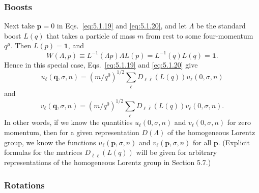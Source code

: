 \subsubsection*{Boosts}

Next take $\mathbf{p}=0$ in Eqs.~\eqref{eq:5.1.19} and \eqref{eq:5.1.20}, and let $\Lambda$
be the standard boost $L(q)$ that takes a particle of mass $m$ from rest to
some four-momentum $q^\mu$. Then $L(p)=\mathbf{1}$, and
\[
  W(\Lambda,p)\equiv L^{-1}(\Lambda p)\Lambda L(p)
  =L^{-1}(q)L(q)=\mathbf{1}.
\]
Hence in this special case, Eqs.~\eqref{eq:5.1.19} and \eqref{eq:5.1.20} give
\begin{equation}
  u_\ell(\mathbf{q},\sigma,n)=(m/q^0)^{1/2}
  \sum_{\bar\ell}D_{\ell\bar\ell}(L(q))u_{\bar\ell}(0,\sigma,n)
  \tag{5.1.21}\label{eq:5.1.21}
\end{equation}
and
\begin{equation}
  v_\ell(\mathbf{q},\sigma,n)=(m/q^0)^{1/2}
  \sum_{\bar\ell}D_{\ell\bar\ell}(L(q))v_{\bar\ell}(0,\sigma,n).
  \tag{5.1.22}\label{eq:5.1.22}
\end{equation}
In other words, if we know the quantities $u_\ell(0,\sigma,n)$ and
$v_\ell(0,\sigma,n)$ for zero momentum, then for a given representation
$D(\Lambda)$ of the homogeneous Lorentz group, we know the functions
$u_\ell(\mathbf{p},\sigma,n)$ and $v_\ell(\mathbf{p},\sigma,n)$ for all
$\mathbf{p}$. (Explicit formulas for the matrices $D_{\bar\ell\ell}(L(q))$
will be given for arbitrary representations of the homogeneous Lorentz group
in Section 5.7.)

\subsubsection*{Rotations}

